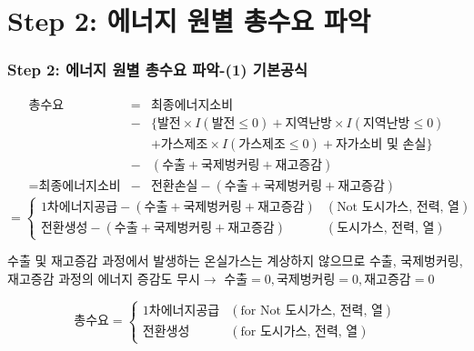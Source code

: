 \documentclass[10pt,compress,slidetop,%
			   hyperref={unicode},xcolor={svgnames},%
			   t]{beamer}
\begin{document}
\section{Step 2: 에너지 원별 총수요 파악}
%
\begin{frame}
	\frametitle{Step 2: 에너지 원별 총수요 파악-(1) 기본공식}
\begin{eqnarray*}
\mbox{총수요}&=&\mbox{최종에너지소비}\\
	&-&\{\mbox{발전}\times I(\mbox{발전}\le 0)+\mbox{지역난방}\times I(\mbox{지역난방}\le 0)\\
	& &+\mbox{가스제조}\times I(\mbox{가스제조}\le 0) +\mbox{자가소비 및 손실}\}\\
	&-&(\mbox{수출}+\mbox{국제벙커링}+\mbox{재고증감})\\
=\mbox{최종에너지소비}&-&\mbox{전환손실}-(\mbox{수출}+\mbox{국제벙커링}+\mbox{재고증감})
\end{eqnarray*}
\begin{displaymath}
=\left\{\begin{array}{lr}
\mbox{1차에너지공급}-(\mbox{수출}+\mbox{국제벙커링}+\mbox{재고증감})&(\mbox{Not 도시가스, 전력, 열})\\
\mbox{전환생성}-(\mbox{수출}+\mbox{국제벙커링}+\mbox{재고증감})&(\mbox{도시가스, 전력, 열})
\end{array}\right.
\end{displaymath}
\smallskip
\begin{small}
수출 및 재고증감 과정에서 발생하는 온실가스는 계상하지 않으므로 수출, 국제벙커링, 재고증감 과정의 에너지 증감도 무시$\rightarrow$ $\mbox{수출}=0, \mbox{국제벙커링} =0,\mbox{재고증감}=0$ 
\end{small}
\begin{displaymath}
\mbox{총수요}=\left\{\begin{array}{ll}
\mbox{1차에너지공급}&(\mbox{for Not 도시가스, 전력, 열})\\
\mbox{전환생성}&(\mbox{for 도시가스, 전력, 열})
\end{array}\right.
\end{displaymath}


\end{frame}
\end{document}
